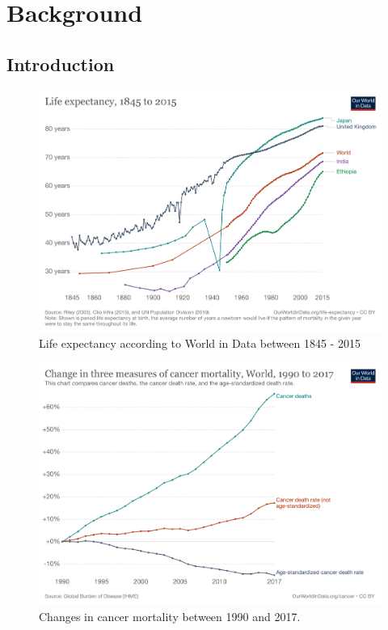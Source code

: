 \chapter{Background} \label{s:ap:intro}

\section{Introduction}


\begin{figure}[!htb]
    \centering
    \includegraphics[width=1.0\textwidth,keepaspectratio]{Images/life-expectancy.png}
    \caption{Life expectancy according to World in Data between 1845 - 2015 \citep{World_in_Data_undated-no}}
      \label{fig:life_expectancy}
  \end{figure}

\begin{figure}[!htb]
    \centering
    \includegraphics[width=1.0\textwidth,keepaspectratio]{Images/cancer-deaths-rate-and-age-standardized-rate-index.png}
      \caption{Changes in cancer mortality between 1990 and 2017. \cite{World_in_Data_undated-gc}}
      \label{fig:cancer_death}
\end{figure}


